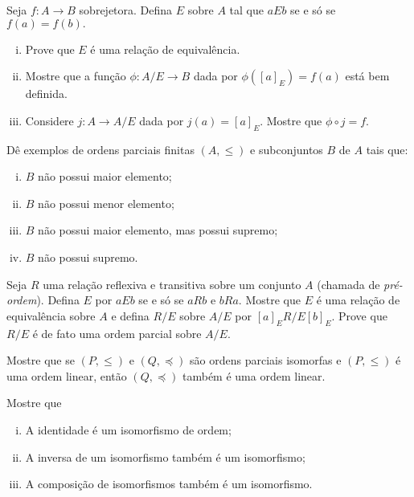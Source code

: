 \documentclass[a4paper]{article}
\begin{document}
   \begin{exercicio}
    Seja \(f\colon A\to B\) sobrejetora. Defina \(E\) sobre \(A\) tal que \(a E
    b\) se e só se \(f(a)=f(b).\)
    \begin{enumerate}[(i)]
    \item Prove que \(E\) é uma relação de equivalência.
    \item Mostre que a função \(\phi\colon A/ E\to B\) dada por
      \(\phi([a]_E)=f(a)\) está bem definida.
    \item Considere \(j\colon A\to A/E\) dada por \(j(a)=[a]_E\). Mostre que
      \(\phi\circ j=f\).
    \end{enumerate}
  \end{exercicio}
  \begin{exercicio}
    Dê exemplos de ordens parciais finitas \((A,\leq)\) e subconjuntos \(B\) de
    \(A\) tais que:
    \begin{enumerate}[(i)]
    \item \(B\) não possui maior elemento;
    \item \(B\) não possui menor elemento;
    \item \(B\) não possui maior elemento, mas possui supremo;
     \item \(B\) não possui supremo.
       \end{enumerate}
     \end{exercicio}
     \begin{exercicio}
       Seja \(R\) uma relação reflexiva e transitiva sobre um conjunto \(A\)
       (chamada de \emph{pré-ordem}). Defina \(E\) por \(a E b\) se e só se \(a
       R b\) e \(b R a\). Mostre que \(E\) é uma relação de equivalência sobre
       \(A\) e defina \(R/E\) sobre \(A/E\) por \([a]_E R/E [b]_E\). Prove que
       \(R/E\) é de fato uma ordem parcial sobre \(A/E\).
     \end{exercicio}
     \begin{exercicio}
     Mostre que se \((P,\leq )\) e \((Q,\preceq )\) são ordens parciais isomorfas
     e \((P,\leq )\) é uma ordem linear, então \((Q,\preceq )\) também é uma
     ordem linear.
   \end{exercicio}
   \begin{exercicio}
     Mostre que
     \begin{enumerate}[(i)]
     \item A identidade é um isomorfismo de ordem;
     \item A inversa de um isomorfismo também é um isomorfismo;
       \item A composição de isomorfismos também é um isomorfismo.
       \end{enumerate}
    \end{exercicio}
\end{document}
